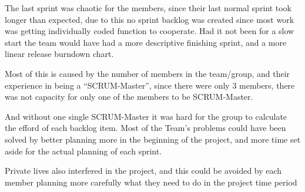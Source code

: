 \documentclass[11pt]{article}
\begin{document}
    The last sprint was chaotic for the members, since their last normal sprint 
    took longer than expected, due to this no sprint backlog was created since 
    most work was getting individually coded function to cooperate.
    Had it not been for a slow start the team would have had a more descriptive
    finishing sprint, and a more linear release burndown chart.
    
    Most of this is caused by the number of members in the team/group, and their 
    experience in being a ``SCRUM-Master'', since there were only 3 members, 
    there was not capacity for only one of the members to be SCRUM-Master.
    
    And without one single SCRUM-Master it was hard for the group to calculate
    the efford of each backlog item. Most of the Team's problems could have been
    solved by better planning more in the beginning of the project, and more time set 
    aside for the actual planning of each sprint.
    
    Private lives also interfered in the project, and this could be avoided by each
    member planning more carefully what they need to do in the project time period 
    
\end{document}
